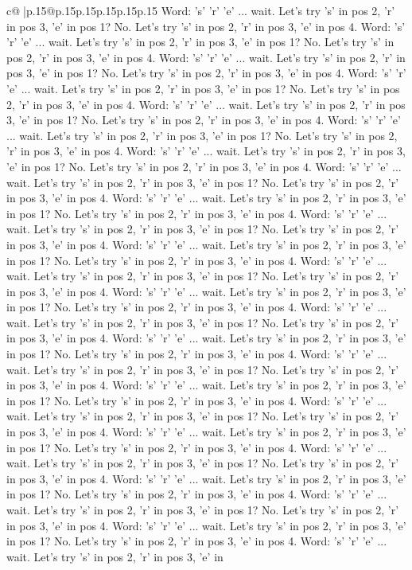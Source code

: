 \documentclass{article}
\begin{document}
{\begin{supertabular}{c@{$\;$}|p{.15\linewidth}@{}p{.15\linewidth}p{.15\linewidth}p{.15\linewidth}p{.15\linewidth}p{.15\linewidth}}
{{{Word: 's' 'r' 'e' ... wait. Let's try 's' in pos 2, 'r' in pos 3, 'e' in pos 1? No. Let's try 's' in pos 2, 'r' in pos 3, 'e' in pos 4. Word: 's' 'r' 'e' ... wait. Let's try 's' in pos 2, 'r' in pos 3, 'e' in pos 1? No. Let's try 's' in pos 2, 'r' in pos 3, 'e' in pos 4. Word: 's' 'r' 'e' ... wait. Let's try 's' in pos 2, 'r' in pos 3, 'e' in pos 1? No. Let's try 's' in pos 2, 'r' in pos 3, 'e' in pos 4. Word: 's' 'r' 'e' ... wait. Let's try 's' in pos 2, 'r' in pos 3, 'e' in pos 1? No. Let's try 's' in pos 2, 'r' in pos 3, 'e' in pos 4. Word: 's' 'r' 'e' ... wait. Let's try 's' in pos 2, 'r' in pos 3, 'e' in pos 1? No. Let's try 's' in pos 2, 'r' in pos 3, 'e' in pos 4. Word: 's' 'r' 'e' ... wait. Let's try 's' in pos 2, 'r' in pos 3, 'e' in pos 1? No. Let's try 's' in pos 2, 'r' in pos 3, 'e' in pos 4. Word: 's' 'r' 'e' ... wait. Let's try 's' in pos 2, 'r' in pos 3, 'e' in pos 1? No. Let's try 's' in pos 2, 'r' in pos 3, 'e' in pos 4. Word: 's' 'r' 'e' ... wait. Let's try 's' in pos 2, 'r' in pos 3, 'e' in pos 1? No. Let's try 's' in pos 2, 'r' in pos 3, 'e' in pos 4. Word: 's' 'r' 'e' ... wait. Let's try 's' in pos 2, 'r' in pos 3, 'e' in pos 1? No. Let's try 's' in pos 2, 'r' in pos 3, 'e' in pos 4. Word: 's' 'r' 'e' ... wait. Let's try 's' in pos 2, 'r' in pos 3, 'e' in pos 1? No. Let's try 's' in pos 2, 'r' in pos 3, 'e' in pos 4. Word: 's' 'r' 'e' ... wait. Let's try 's' in pos 2, 'r' in pos 3, 'e' in pos 1? No. Let's try 's' in pos 2, 'r' in pos 3, 'e' in pos 4. Word: 's' 'r' 'e' ... wait. Let's try 's' in pos 2, 'r' in pos 3, 'e' in pos 1? No. Let's try 's' in pos 2, 'r' in pos 3, 'e' in pos 4. Word: 's' 'r' 'e' ... wait. Let's try 's' in pos 2, 'r' in pos 3, 'e' in pos 1? No. Let's try 's' in pos 2, 'r' in pos 3, 'e' in pos 4. Word: 's' 'r' 'e' ... wait. Let's try 's' in pos 2, 'r' in pos 3, 'e' in pos 1? No. Let's try 's' in pos 2, 'r' in pos 3, 'e' in pos 4. Word: 's' 'r' 'e' ... wait. Let's try 's' in pos 2, 'r' in pos 3, 'e' in pos 1? No. Let's try 's' in pos 2, 'r' in pos 3, 'e' in pos 4. Word: 's' 'r' 'e' ... wait. Let's try 's' in pos 2, 'r' in pos 3, 'e' in pos 1? No. Let's try 's' in pos 2, 'r' in pos 3, 'e' in pos 4. Word: 's' 'r' 'e' ... wait. Let's try 's' in pos 2, 'r' in pos 3, 'e' in pos 1? No. Let's try 's' in pos 2, 'r' in pos 3, 'e' in pos 4. Word: 's' 'r' 'e' ... wait. Let's try 's' in pos 2, 'r' in pos 3, 'e' in pos 1? No. Let's try 's' in pos 2, 'r' in pos 3, 'e' in pos 4. Word: 's' 'r' 'e' ... wait. Let's try 's' in pos 2, 'r' in pos 3, 'e' in pos 1? No. Let's try 's' in pos 2, 'r' in pos 3, 'e' in pos 4. Word: 's' 'r' 'e' ... wait. Let's try 's' in pos 2, 'r' in pos 3, 'e' in pos 1? No. Let's try 's' in pos 2, 'r' in pos 3, 'e' in pos 4. Word: 's' 'r' 'e' ... wait. Let's try 's' in pos 2, 'r' in pos 3, 'e' in pos 1? No. Let's try 's' in pos 2, 'r' in pos 3, 'e' in pos 4. Word: 's' 'r' 'e' ... wait. Let's try 's' in pos 2, 'r' in pos 3, 'e' in pos 1? No. Let's try 's' in pos 2, 'r' in pos 3, 'e' in pos 4. Word: 's' 'r' 'e' ... wait. Let's try 's' in pos 2, 'r' in pos 3, 'e' in pos 1? No. Let's try 's' in pos 2, 'r' in pos 3, 'e' in pos 4. Word: 's' 'r' 'e' ... wait. Let's try 's' in pos 2, 'r' in pos 3, 'e' in }}}
\end{supertabular}}
\end{document}
